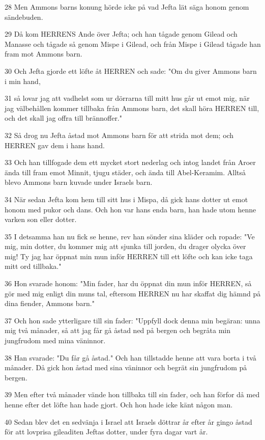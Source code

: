 \par 28 Men Ammons barns konung hörde icke på vad Jefta lät säga honom genom sändebuden.
\par 29 Då kom HERRENS Ande över Jefta; och han tågade genom Gilead och Manasse och tågade så genom Mispe i Gilead, och från Mispe i Gilead tågade han fram mot Ammons barn.
\par 30 Och Jefta gjorde ett löfte åt HERREN och sade: "Om du giver Ammons barn i min hand,
\par 31 så lovar jag att vadhelst som ur dörrarna till mitt hus går ut emot mig, när jag välbehållen kommer tillbaka från Ammons barn, det skall höra HERREN till, och det skall jag offra till brännoffer."
\par 32 Så drog nu Jefta åstad mot Ammons barn för att strida mot dem; och HERREN gav dem i hans hand.
\par 33 Och han tillfogade dem ett mycket stort nederlag och intog landet från Aroer ända till fram emot Minnit, tjugu städer, och ända till Abel-Keramim. Alltså blevo Ammons barn kuvade under Israels barn.
\par 34 När sedan Jefta kom hem till sitt hus i Mispa, då gick hans dotter ut emot honom med pukor och dans. Och hon var hans enda barn, han hade utom henne varken son eller dotter.
\par 35 I detsamma han nu fick se henne, rev han sönder sina kläder och ropade: "Ve mig, min dotter, du kommer mig att sjunka till jorden, du drager olycka över mig! Ty jag har öppnat min mun inför HERREN till ett löfte och kan icke taga mitt ord tillbaka."
\par 36 Hon svarade honom: "Min fader, har du öppnat din mun inför HERREN, så gör med mig enligt din muns tal, eftersom HERREN nu har skaffat dig hämnd på dina fiender, Ammons barn."
\par 37 Och hon sade ytterligare till sin fader: "Uppfyll dock denna min begäran: unna mig två månader, så att jag får gå åstad ned på bergen och begråta min jungfrudom med mina väninnor.
\par 38 Han svarade: "Du får gå åstad." Och han tillstadde henne att vara borta i två månader. Då gick hon åstad med sina väninnor och begrät sin jungfrudom på bergen.
\par 39 Men efter två månader vände hon tillbaka till sin fader, och han förfor då med henne efter det löfte han hade gjort. Och hon hade icke känt någon man.
\par 40 Sedan blev det en sedvänja i Israel att Israels döttrar år efter år gingo åstad för att lovprisa gileaditen Jeftas dotter, under fyra dagar vart år.

